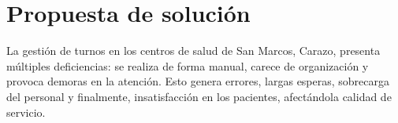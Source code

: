 \section{Propuesta de solución}

La gestión de turnos en los centros de salud de San Marcos, Carazo, presenta múltiples deficiencias: se realiza de forma manual, carece de organización y provoca demoras en la atención. Esto genera errores, largas esperas, sobrecarga del personal y finalmente, insatisfacción en los pacientes, afectándola calidad de servicio.
